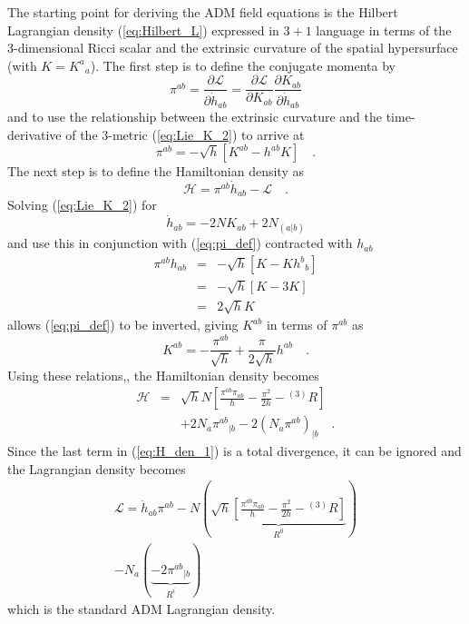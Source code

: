 \documentclass[twocolumn]{article}
\def\.{{\quad .}}
\begin{document}
The starting point for deriving the ADM field equations is the Hilbert Lagrangian
density (\ref{eq:Hilbert_L}) expressed in $3+1$ language in terms of the
3-dimensional Ricci scalar and the extrinsic curvature of the spatial
hypersurface (with $K= {K^a}_{a}$).  The first step is to define the conjugate
momenta by
\[
   \pi^{ab} = \frac{\partial {\mathcal L} } {\partial {\dot h}_{ab}}
            = \frac{\partial {\mathcal L} } {\partial K_{ab}}
              \frac{\partial K_{ab}}{\partial {\dot h}_{ab} }
\]
and to use the relationship between the extrinsic curvature and the
time-derivative of the 3-metric (\ref{eq:Lie_K_2}) to arrive at
\begin{equation}\label{eq:pi_def}
   \pi^{ab} = -\sqrt{h} \left[ K^{ab} - h^{ab} K \right] \.
\end{equation}
The next step is to define the Hamiltonian density as
\[
   {\mathcal H} = \pi^{ab} {\dot h}_{ab} - {\mathcal L} \.
\]
Solving (\ref{eq:Lie_K_2}) for
\[
   {\dot h}_{ab} = - 2 N K_{ab} + 2 N_{(a|b)}
\]
and use this in conjunction with (\ref{eq:pi_def}) contracted with $h_{ab}$
\begin{eqnarray*}
   \pi^{ab} h_{ab} & = & -\sqrt{h} \left[ K - K {h^b}_{b} \right] \\
                   & = & -\sqrt{h} \left[ K - 3 K \right] \\
                   & = & 2\sqrt{h} K
\end{eqnarray*}
allows (\ref{eq:pi_def}) to be inverted, giving $K^{ab}$ in terms of $\pi^{ab}$
as
\[
   K^{ab} = -\frac{\pi^{ab}}{\sqrt{h}} + \frac{\pi}{2 \sqrt{h}} h^{ab} \.
\]
Using these relations,, the Hamiltonian density becomes
\begin{eqnarray}\label{eq:H_den_1}
   {\mathcal H} & = & \sqrt{h} N \left[ \frac{\pi^{ab} \pi_{ab}}{h} -
                                   \frac{ \pi^2}{2 h} - {}^{(3)}R
                            \right] \nonumber \\
               &   & + 2 N_a {\pi^{ab}}_{|b} - 2 \left( N_a \pi^{ab} \right)_{|b} \.
\end{eqnarray}
Since the last term in (\ref{eq:H_den_1}) is a total divergence, it can be
ignored and the Lagrangian density becomes
\begin{eqnarray}
   {\mathcal L} = {\dot h}_{ab} \pi^{ab} - N \left(
                 \underbrace{ \sqrt{h}
                 \left[ \frac{\pi^{ab} \pi_{ab}}{h} -
                        \frac{ \pi^2}{2 h} - {}^{(3)}R
                 \right]}_{R^0} \right) \nonumber \\
                 - N_a \left( \underbrace{ -2  {\pi^{ab}}_{|b}}_{R^i} \right)
\end{eqnarray}
which is the standard ADM Lagrangian density.
\end{document}
